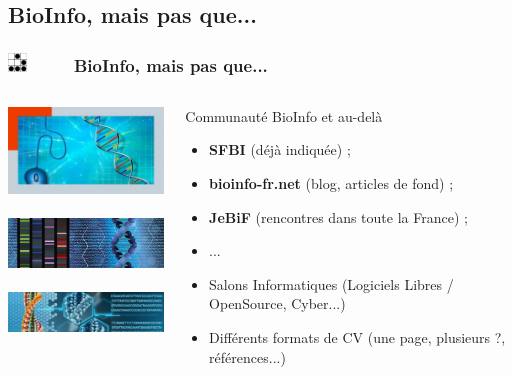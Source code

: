 \documentclass[slidetop,11pt]{beamer}
\def\sectionPartVa{BioInfo, mais pas que...}
\def\moreInFrameTitle{\includegraphics[height=0.5cm]{img/logo_glider.png}~~~~~}
\begin{document}
\subsection{\sectionPartVa}
\begin{frame}
	\frametitle{\moreInFrameTitle \sectionPartVa}
	\begin{columns}[T]
	\begin{column}[T]{5cm}
		\includegraphics[width=5cm]{img/b5aa794357219a113197a4fe6c18c87e0cb681ff.jpg}~\\
		\includegraphics[width=5cm]{img/bioinformatics.jpg}~\\
		\includegraphics[width=5cm]{img/bioinformatics2.jpg}~\\
	\end{column}
	\begin{column}[T]{7cm}
		\begin{beamerboxesrounded}	[lower=substructureDE, %
		 				 upper=block title DE,%
						 shadow=true]%
		       {Communaut{\'e} BioInfo et au-del{\`a}}
			\begin{itemize}
				\item \textbf{SFBI} (d{\'e}j{\`a} indiqu{\'e}e) ; 
				\item \textbf{bioinfo-fr.net} (blog, articles de fond) ; 
				\item \textbf{JeBiF} (rencontres dans toute la France) ; 
				\item ... 
				\item Salons Informatiques (Logiciels Libres / OpenSource, Cyber...)
				\item Diff{\'e}rents formats de CV (une page, plusieurs ?, r{\'e}f{\'e}rences...)
			\end{itemize}
		\end{beamerboxesrounded}
	\end{column}
	\end{columns}
\end{frame}
\end{document}
